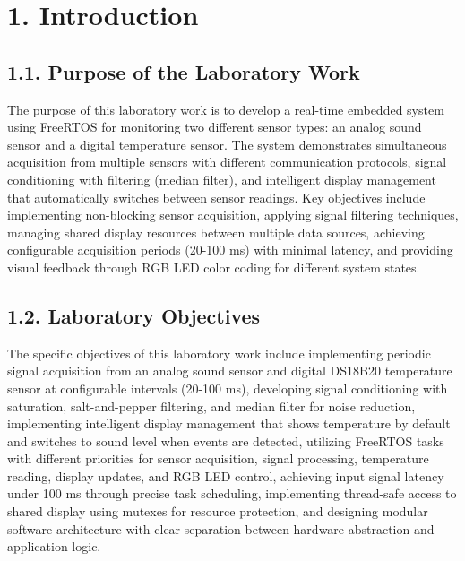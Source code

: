 \documentclass[12pt]{article}
\begin{document}
\setcounter{page}{1}
\pagestyle{fancy}
\fancyhf{}
\rhead{\thepage}

\section*{1. Introduction}

\subsection*{1.1. Purpose of the Laboratory Work}

The purpose of this laboratory work is to develop a real-time embedded system using FreeRTOS for monitoring two different sensor types: an analog sound sensor and a digital temperature sensor. The system demonstrates simultaneous acquisition from multiple sensors with different communication protocols, signal conditioning with filtering (median filter), and intelligent display management that automatically switches between sensor readings. Key objectives include implementing non-blocking sensor acquisition, applying signal filtering techniques, managing shared display resources between multiple data sources, achieving configurable acquisition periods (20-100 ms) with minimal latency, and providing visual feedback through RGB LED color coding for different system states.

\subsection*{1.2. Laboratory Objectives}

The specific objectives of this laboratory work include implementing periodic signal acquisition from an analog sound sensor and digital DS18B20 temperature sensor at configurable intervals (20-100 ms), developing signal conditioning with saturation, salt-and-pepper filtering, and median filter for noise reduction, implementing intelligent display management that shows temperature by default and switches to sound level when events are detected, utilizing FreeRTOS tasks with different priorities for sensor acquisition, signal processing, temperature reading, display updates, and RGB LED control, achieving input signal latency under 100 ms through precise task scheduling, implementing thread-safe access to shared display using mutexes for resource protection, and designing modular software architecture with clear separation between hardware abstraction and application logic.
\end{document}
